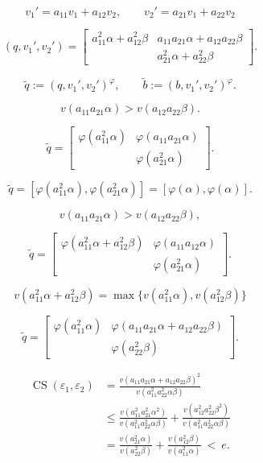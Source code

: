 \documentclass{article}
\begin{document}
$$v_1'=a_{11}v_1+a_{12} v_2,\qquad v_2'=a_{21}v_1+a_{22}v_2$$

\begin{equation}\label{eq:II.8.5}
(q,v_1',v_2')=\begin{bmatrix} a_{11}^2 {\alpha} +a_{12}^2{\beta}& a_{11}a_{21}{\alpha}+a_{12}a_{22}{\beta}\\
 & a_{21}^2{\alpha}+a_{22}^2{\beta}\end{bmatrix}.
\end{equation}

$${\tilde q}:=(q,v_1',v_2')^{\varphi},\qquad{\tilde b}:=(b,v_1',v_2')^{\varphi}.$$

$$v(a_{11}a_{21}{\alpha})>v(a_{12}a_{22}{\beta}).$$

$${\tilde q}=\begin{bmatrix}{\varphi}(a_{11}^2{\alpha})& {\varphi}(a_{11}a_{21}{\alpha})\\  & {\varphi}(a_{21}^2{\alpha})
\end{bmatrix}.$$

\begin{equation}\label{eq:II.8.6}
{\tilde q}=[{\varphi}(a_{11}^2{\alpha}),{\varphi}(a_{21}^2{\alpha})]=[{\varphi}({\alpha}),{\varphi}({\alpha})].
\end{equation}

$$v(a_{11}a_{21}{\alpha})>v(a_{12}a_{22}{\beta}),$$

$${\tilde q}=\begin{bmatrix}{\varphi}(a_{11}^2{\alpha} + a_{12}^2{\beta}) & {\varphi}(a_{11}a_{12}{\alpha})\\  & {\varphi}(a_{21}^2{\alpha})\end{bmatrix}.$$

$$ v(a_{11}^2{\alpha} + a_{12}^2 {\beta}) = \max \{   v(a_{11}^2{\alpha}) , v( a_{12}^2 {\beta})\} $$

$${\tilde q}=\begin{bmatrix} {\varphi}(a_{11}^2{\alpha}) & {\varphi}(a_{11}a_{21}{\alpha}+a_{12}a_{22}{\beta})\\
 & {\varphi}(a_{22}^2{\beta})\end{bmatrix}.$$

\begin{align*}
{\operatorname{CS}}({\varepsilon}_1,{\varepsilon}_2)&=\frac{v(a_{11}a_{21}{\alpha}+a_{12}a_{22}{\beta})^2}{v(a_{11}^2a_{22}^2{\alpha}{\beta})}\\[1mm]
& \leq \frac{v(a_{11}^2a_{21}^2{\alpha}^2)}{v(a_{11}^2a_{22}^2{\alpha}{\beta})}+\frac{v(a_{12}^2a_{22}^2{\beta}^2)}{v(a_{11}^2a_{22}^2{\alpha}{\beta})}\\[1mm]
&=\frac{v(a_{21}^2{\alpha})}{v(a_{22}^2{\beta})}+\frac{v(a_{12}^2{\beta})}{v(a_{11}^2{\alpha})} {\ {<} \ }e.\end{align*}
\end{document}
